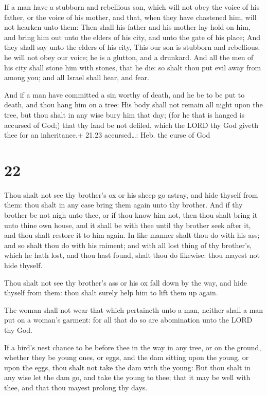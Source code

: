  If a man have a stubborn and rebellious son, which will
not obey the voice of his father, or the voice of his mother, and that,
when they have chastened him, will not hearken unto them: 
Then shall his father and his mother lay hold on him, and bring him out
unto the elders of his city, and unto the gate of his place;
 And they shall say unto the elders of his city, This our
son is stubborn and rebellious, he will not obey our voice; he is a
glutton, and a drunkard.  And all the men of his city shall
stone him with stones, that he die: so shalt thou put evil away from
among you; and all Israel shall hear, and fear.

 And if a man have committed a sin worthy of death, and
he be to be put to death, and thou hang him on a tree:  His
body shall not remain all night upon the tree, but thou shalt in any
wise bury him that day; (for he that is hanged is accursed of God;) that
thy land be not defiled, which the LORD thy God giveth thee for an
inheritance.+ 21.23 accursed\ldots: Heb. the curse of God

\hypertarget{section-21}{%
\section{22}\label{section-21}}

 Thou shalt not see thy brother's ox or his sheep go astray,
and hide thyself from them: thou shalt in any case bring them again unto
thy brother.  And if thy brother be not nigh unto thee, or
if thou know him not, then thou shalt bring it unto thine own house, and
it shall be with thee until thy brother seek after it, and thou shalt
restore it to him again.  In like manner shalt thou do with
his ass; and so shalt thou do with his raiment; and with all lost thing
of thy brother's, which he hath lost, and thou hast found, shalt thou do
likewise: thou mayest not hide thyself.

 Thou shalt not see thy brother's ass or his ox fall down
by the way, and hide thyself from them: thou shalt surely help him to
lift them up again.

 The woman shall not wear that which pertaineth unto a
man, neither shall a man put on a woman's garment: for all that do so
are abomination unto the LORD thy God.

 If a bird's nest chance to be before thee in the way in
any tree, or on the ground, whether they be young ones, or eggs, and the
dam sitting upon the young, or upon the eggs, thou shalt not take the
dam with the young:  But thou shalt in any wise let the dam
go, and take the young to thee; that it may be well with thee, and that
thou mayest prolong thy days.

